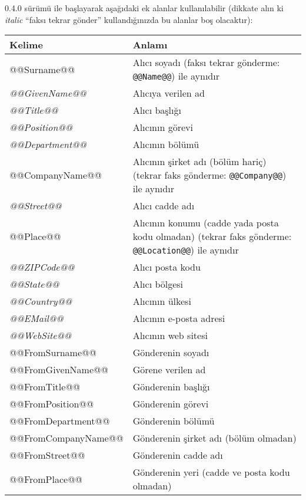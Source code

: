 \documentclass[a4paper,10pt]{scrartcl}
\begin{document}
0.4.0 sürümü ile başlayarak aşağıdaki ek alanlar kullanılabilir (dikkate alın ki \textit{italic} ``faksı tekrar gönder'' kullandığınızda bu alanlar boş olacaktır):
\begin{center}
\begin{tabular}{|l|p{}|}
\hline
\bfseries Kelime & \bfseries Anlamı \\
\hline\hline
\ttfamily @@Surname@@ & Alıcı soyadı (faksı tekrar gönderme: \texttt{@@Name@@}) ile aynıdır \\\hline
\ttfamily\itshape @@GivenName@@ & Alıcıya verilen ad \\\hline
\ttfamily\itshape @@Title@@ & Alıcı başlığı \\\hline
\ttfamily\itshape @@Position@@ & Alıcının görevi \\\hline
\ttfamily\itshape @@Department@@ & Alıcının bölümü \\\hline
\ttfamily @@CompanyName@@ & Alıcının şirket adı (bölüm hariç) (tekrar faks gönderme: \texttt{@@Company@@}) ile aynıdır\\\hline
\ttfamily\itshape @@Street@@ & Alıcı cadde adı \\\hline
\ttfamily @@Place@@ & Alıcının konumu (cadde yada posta kodu olmadan) (tekrar faks gönderme: \texttt{@@Location@@}) ile aynıdır\\\hline
\ttfamily\itshape @@ZIPCode@@ & Alıcı posta kodu \\\hline
\ttfamily\itshape @@State@@ & Alıcı bölgesi \\\hline
\ttfamily\itshape @@Country@@ & Alıcının ülkesi\\\hline
\ttfamily\itshape @@EMail@@ & Alıcının e-posta adresi\\\hline
\ttfamily\itshape @@WebSite@@ & Alıcının web sitesi\\\hline\hline
\ttfamily @@FromSurname@@ & Gönderenin soyadı \\\hline
\ttfamily @@FromGivenName@@ & Görene verilen ad \\\hline
\ttfamily @@FromTitle@@ & Gönderenin başlığı \\\hline
\ttfamily @@FromPosition@@ & Gönderenin görevi \\\hline
\ttfamily @@FromDepartment@@ & Gönderenin bölümü\\\hline
\ttfamily @@FromCompanyName@@ & Gönderenin şirket adı (bölüm olmadan)\\\hline
\ttfamily @@FromStreet@@ & Gönderenin cadde adı \\\hline
\ttfamily @@FromPlace@@ & Gönderenin yeri (cadde ve posta kodu olmadan)\\\hline

\end{tabular}
\end{center}
\end{document}
